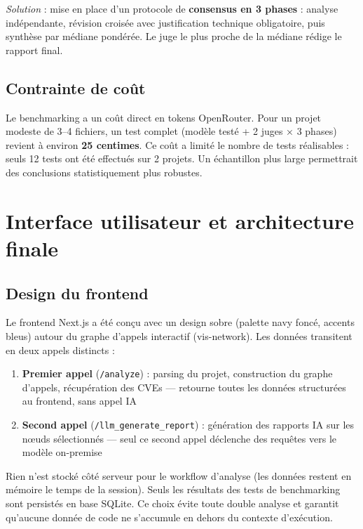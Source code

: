 \documentclass[a4paper, 12pt, hidelinks]{article}
\begin{document}
\textit{Solution} : mise en place d'un protocole de \textbf{consensus en 3 phases} : analyse indépendante, révision croisée avec justification technique obligatoire, puis synthèse par médiane pondérée. Le juge le plus proche de la médiane rédige le rapport final.

\subsection*{Contrainte de coût}

Le benchmarking a un coût direct en tokens OpenRouter. Pour un projet modeste de 3--4 fichiers, un test complet (modèle testé + 2 juges × 3 phases) revient à environ \textbf{25 centimes}. Ce coût a limité le nombre de tests réalisables : seuls 12 tests ont été effectués sur 2 projets. Un échantillon plus large permettrait des conclusions statistiquement plus robustes.

\section{Interface utilisateur et architecture finale}

\subsection*{Design du frontend}

Le frontend Next.js a été conçu avec un design sobre (palette navy foncé, accents bleus) autour du graphe d'appels interactif (vis-network). Les données transitent en deux appels distincts :

\begin{enumerate}
  \item \textbf{Premier appel} (\texttt{/analyze}) : parsing du projet, construction du graphe d'appels, récupération des CVEs — retourne toutes les données structurées au frontend, sans appel IA
  \item \textbf{Second appel} (\texttt{/llm\_generate\_report}) : génération des rapports IA sur les nœuds sélectionnés — seul ce second appel déclenche des requêtes vers le modèle on-premise
\end{enumerate}

Rien n'est stocké côté serveur pour le workflow d'analyse (les données restent en mémoire le temps de la session). Seuls les résultats des tests de benchmarking sont persistés en base SQLite. Ce choix évite toute double analyse et garantit qu'aucune donnée de code ne s'accumule en dehors du contexte d'exécution.
\end{document}

